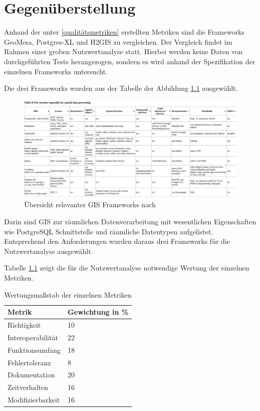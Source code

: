 \chapter{Gegenüberstellung}

Anhand der unter \ref{qualitätsmetriken} erstellten Metriken sind die Frameworks GeoMesa, Postgres-XL und H2GIS zu vergleichen.
Der Vergleich findet im Rahmen einer groben Nutzwertanalyse statt.
Hierbei werden keine Daten von durchgeführten Tests herangezogen, sondern es wird anhand der Spezifikation der einzelnen Frameworks untersucht.

Die drei Frameworks wurden aus der Tabelle der Abbildung \ref{fig:spatialdatabases} ausgewählt.
\begin{figure}
\centering
\includegraphics[width=\textwidth]{Abbildungen/table_spatialdatabases.pdf}
\caption[Übersicht relevanter GIS Frameworks]{Übersicht relevanter GIS Frameworks nach \cite{website:wiki-spatialdatabase}}
\label{fig:spatialdatabases}
\end{figure}
Darin sind GIS zur räumlichen Datenverarbeitung mit wesentlichen Eigenschaften wie PostgreSQL Schnittstelle und räumliche Datentypen aufgelistet.
Entsprechend den Anforderungen wurden daraus drei Frameworks für die Nutzwertanalyse ausgewählt.


Tabelle \ref{table:Wertungsmassstab} zeigt die für die Nutzwertanalyse notwendige Wertung der einzelnen Metriken.
\begin{table}[h]
\centering
\begin{tabular}{l|l}
\textbf{Metrik} & \textbf{Gewichtung in \%} \\ \hline
Richtigkeit & 10 \\ \hline
Interoperabilität & 22 \\ \hline
Funktionsumfang & 18 \\ \hline
Fehlertoleranz & 8 \\ \hline
Dokumentation & 20 \\ \hline
Zeitverhalten & 16 \\ \hline
Modifizierbarkeit & 16
\end{tabular}
\caption{Wertungsmaßstab der einzelnen Metriken}
\label{table:Wertungsmassstab}
\end{table}

